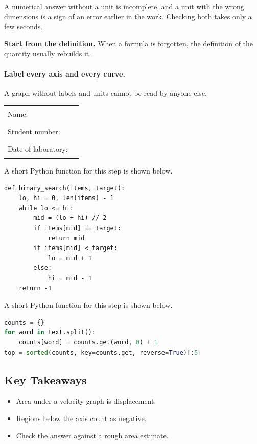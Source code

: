\documentclass[11pt]{article}
\begin{document}
A numerical answer without a unit is incomplete, and a unit with the wrong dimensions is a sign of an error earlier in the work. Checking both takes only a few seconds.

\textbf{Start from the definition.} When a formula is forgotten, the definition of the quantity usually rebuilds it.

\paragraph{Label every axis and every curve.} A graph without labels and units cannot be read by anyone else.

\noindent\begin{tabular}{@{}ll@{}}
Name: & \rule{7cm}{0.4pt} \\[10pt]
Student number: & \rule{7cm}{0.4pt} \\[10pt]
Date of laboratory: & \rule{7cm}{0.4pt} \\
\end{tabular}

A short Python function for this step is shown below.

{\small\begin{verbatim}
def binary_search(items, target):
    lo, hi = 0, len(items) - 1
    while lo <= hi:
        mid = (lo + hi) // 2
        if items[mid] == target:
            return mid
        if items[mid] < target:
            lo = mid + 1
        else:
            hi = mid - 1
    return -1
\end{verbatim}}

A short Python function for this step is shown below.

\begin{lstlisting}[language=Python]
counts = {}
for word in text.split():
    counts[word] = counts.get(word, 0) + 1
top = sorted(counts, key=counts.get, reverse=True)[:5]
\end{lstlisting}

\subsection*{Key Takeaways}
\begin{itemize}
\item Area under a velocity graph is displacement.
\item Regions below the axis count as negative.
\item Check the answer against a rough area estimate.
\end{itemize}
\end{document}
